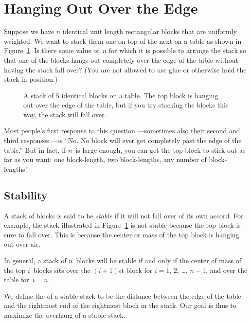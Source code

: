 \section{Hanging Out Over the Edge}\label{book_stacking_sec}

Suppose we have $n$ identical unit length rectangular blocks that are
uniformly weighted.  We want to stack them one on top of the next on a
table as shown in Figure~\ref{fig:9G11}.  Is there some value of~$n$
for which it is possible to arrange the stack so that one of the
blocks hangs out completely over the edge of the table without having
the stack fall over?  (You are not allowed to use glue or otherwise
hold the stack in position.)

\begin{figure}


\caption{A stack of 5 identical blocks on a table.  The top block is
  hanging out over the edge of the table, but if you try stacking the
  blocks this way, the stack will fall over.}

\label{fig:9G11}

\end{figure}

Most people's first response to this question ---sometimes also their
second and third responses ---is ``No. No block will ever get
completely past the edge of the table.''  But in fact, if $n$~is large
enough, you can get the top block to stick out as far as you want: one
block-length, two block-lengths, any number of block-lengths!

\subsection{Stability}\label{sec:stability}

A stack of blocks is said to be \emph{stable} if it will not fall over
of its own accord.  For example, the stack illustrated in
Figure~\ref{fig:9G11} is not stable because the top block is sure to
fall over.  This is because the center or mass of the top block is
hanging out over air.

In general, a stack of $n$~blocks will be stable if and only if the
center of mass of the top $i$~blocks sits over the $(i + 1)$st block
for $i = 1$, 2, \dots, $n - 1$, and over the table for~$i = n$.

We define the  of a stable stack to be the distance
between the edge of the table and the rightmost end of the rightmost
block in the stack.  Our goal is thus to maximize the overhang of a
stable stack.

